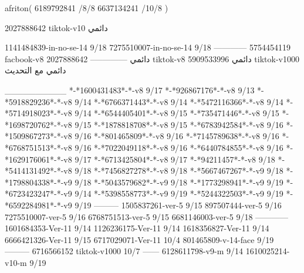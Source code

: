afriton(
6189792841 /8/8
6637134241 /10/8
)

2027888642 tiktok-v10
دائمي



1141484839-in-no-se-14 9/18
7275510007-in-no-se-14 9/18
------------
5754454119 facbook-v8
دائمي
--------------
2027888642 tiktok-v8
دائمي
5909533996 tiktok-v1000
دائمي مع التحديث

__________
*-*1600431483*-*-v8 9/17
*-*926867176*-*-v8 9/13
*-*5918829236*-*-v8 9/14
*-*6766371443*-*-v8 9/14
*-*5472116366*-*-v8 9/14
*-*5714918023*-*-v8 9/14
*-*6544405401*-*-v8 9/15
*-*735471446*-*-v8 9/15
*-*1698720762*-*-v8 9/15
*-*1878818708*-*-v8 9/15
*-*6783942584*-*-v8 9/16
*-*1509867273*-*-v8 9/16
*-*801465809*-*-v8 9/16
*-*7145789638*-*-v8 9/16
*-*6768751513*-*-v8 9/16
*-*7022049118*-*-v8 9/16
*-*6440784855*-*-v8 9/16
*-*1629176061*-*-v8 9/17
*-*6713425804*-*-v8 9/17
*-*94211457*-*-v8 9/18
*-*5414131492*-*-v8 9/18
*-*7456827278*-*-v8 9/18
*-*5667467267*-*-v9 9/18
*-*1798804338*-*-v9 9/18
*-*5043579682*-*-v9 9/18
*-*1773298941*-*-v9 9/19
*-*6723423247*-*-v9 9/14
*-*5398558773*-*-v9 9/19
*-*5244322503*-*-v9 9/19
*-*6592284981*-*-v9 9/19
---------
1505837261-ver-5 9/15
897507444-ver-5 9/16
7275510007-ver-5 9/16
6768751513-ver-5 9/15
6681146003-ver-5 9/18
------------
1601684353-Ver-11
9/14
1126236175-Ver-11
9/14
1618356827-Ver-11
9/14
6666421326-Ver-11
9/15
6717029071-Ver-11
10/4
801465809-v-14-face 9/19
---------
6716566152 tiktok-v1000
10/7
------
6128611798-v9-m
9/14
1610025214-v10-m 9/19
